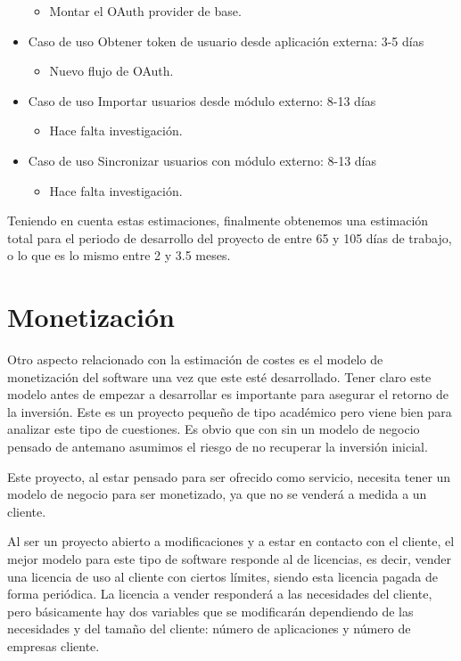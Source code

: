 \documentclass[12pt,a4paperpaper,]{report}
\providecommand{\tightlist}{%
  \setlength{\itemsep}{0pt}\setlength{\parskip}{0pt}}
\begin{document}
\begin{itemize}
  \begin{itemize}
  \tightlist
  \item
    Montar el OAuth provider de base.
  \end{itemize}
\item
  Caso de uso Obtener token de usuario desde aplicación externa: 3-5
  días

  \begin{itemize}
  \tightlist
  \item
    Nuevo flujo de OAuth.
  \end{itemize}
\item
  Caso de uso Importar usuarios desde módulo externo: 8-13 días

  \begin{itemize}
  \tightlist
  \item
    Hace falta investigación.
  \end{itemize}
\item
  Caso de uso Sincronizar usuarios con módulo externo: 8-13 días

  \begin{itemize}
  \tightlist
  \item
    Hace falta investigación.
  \end{itemize}
\end{itemize}

Teniendo en cuenta estas estimaciones, finalmente obtenemos una
estimación total para el periodo de desarrollo del proyecto de entre 65
y 105 días de trabajo, o lo que es lo mismo entre 2 y 3.5 meses.

\section{Monetización}\label{monetizaciuxf3n}

Otro aspecto relacionado con la estimación de costes es el modelo de
monetización del software una vez que este esté desarrollado. Tener
claro este modelo antes de empezar a desarrollar es importante para
asegurar el retorno de la inversión. Este es un proyecto pequeño de tipo
académico pero viene bien para analizar este tipo de cuestiones. Es
obvio que con sin un modelo de negocio pensado de antemano asumimos el
riesgo de no recuperar la inversión inicial.

Este proyecto, al estar pensado para ser ofrecido como servicio,
necesita tener un modelo de negocio para ser monetizado, ya que no se
venderá a medida a un cliente.

Al ser un proyecto abierto a modificaciones y a estar en contacto con el
cliente, el mejor modelo para este tipo de software responde al de
licencias, es decir, vender una licencia de uso al cliente con ciertos
límites, siendo esta licencia pagada de forma periódica. La licencia a
vender responderá a las necesidades del cliente, pero básicamente hay
dos variables que se modificarán dependiendo de las necesidades y del
tamaño del cliente: número de aplicaciones y número de empresas cliente.
\end{document}
